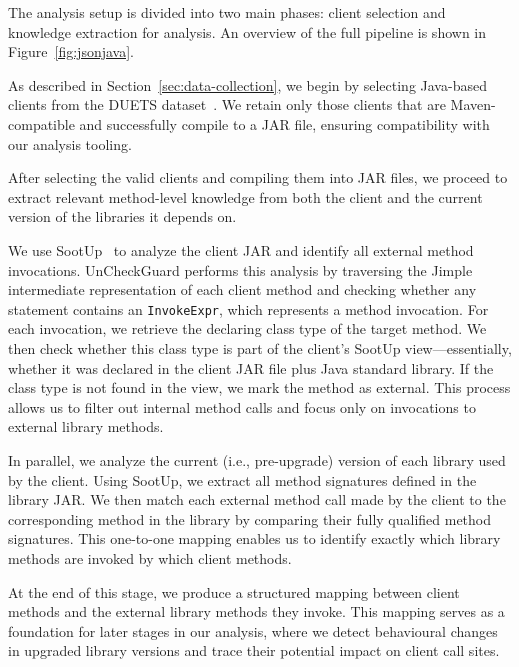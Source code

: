 The analysis setup is divided into two main phases: client selection and knowledge extraction for analysis. An overview of the full pipeline is shown in Figure~\ref{fig:jsonjava}.

As described in Section~\ref{sec:data-collection}, we begin by selecting Java-based clients from the DUETS dataset~\cite{durieux21:_duets}. We retain only those clients that are Maven-compatible and successfully compile to a JAR file, ensuring compatibility with our analysis tooling.

After selecting the valid clients and compiling them into JAR files, we proceed to extract relevant method-level knowledge from both the client and the current version of the libraries it depends on.

We use SootUp~\cite{Karakaya24:_sootup} to analyze the client JAR and identify all external method invocations. UnCheckGuard performs this analysis by traversing the Jimple intermediate representation of each client method and checking whether any statement contains an \texttt{InvokeExpr}, which represents a method invocation. For each invocation, we retrieve the declaring class type of the target method. We then check whether this class type is part of the client’s SootUp view---essentially, whether it was declared in the client JAR file plus Java standard library. If the class type is not found in the view, we mark the method as external. This process allows us to filter out internal method calls and focus only on invocations to external library methods.

In parallel, we analyze the current (i.e., pre-upgrade) version of each library used by the client. Using SootUp, we extract all method signatures defined in the library JAR. We then match each external method call made by the client to the corresponding method in the library by comparing their fully qualified method signatures. This one-to-one mapping enables us to identify exactly which library methods are invoked by which client methods.

At the end of this stage, we produce a structured mapping between client methods and the external library methods they invoke. This mapping serves as a foundation for later stages in our analysis, where we detect behavioural changes in upgraded library versions and trace their potential impact on client call sites.

